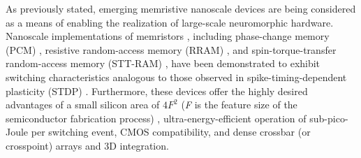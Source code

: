 

\noindent As previously stated, emerging memristive nanoscale devices are being considered as a means of enabling the realization of large-scale neuromorphic hardware. Nanoscale implementations of memristors \cite{krzysteczko2012memristive}, including phase-change memory (PCM) \cite{kang2015emulation}, resistive random-access memory (RRAM) \cite{mandal2014novel}, and spin-torque-transfer random-access memory (STT-RAM) \cite{sengupta2015spin}, have been demonstrated to exhibit switching characteristics analogous to those observed in spike-timing-dependent plasticity (STDP) \cite{li2013ultrafast}. Furthermore, these devices offer the highly desired advantages of a small silicon area of $4F^2$ (\textit{F} is the feature size of the semiconductor fabrication process) \cite{chen2016review}, ultra-energy-efficient operation of sub-pico-Joule per switching event, CMOS compatibility, and dense crossbar (or crosspoint) arrays and 3D integration.\\

